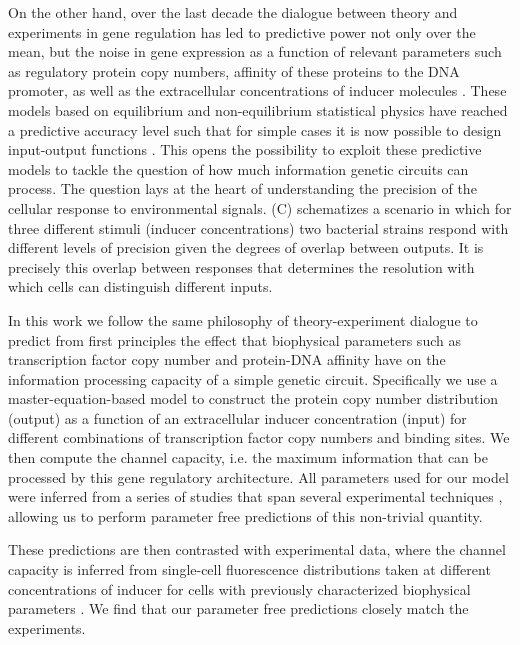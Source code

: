 On the other hand, over the last decade the dialogue between theory and
experiments in gene regulation has led to predictive power not only over the
mean, but the noise in gene expression as a function of relevant parameters such
as regulatory protein copy numbers, affinity of these proteins to the DNA
promoter, as well as the extracellular concentrations of inducer
molecules \cite{Garcia2011c, Jones2014a, Brewster2014, Razo-Mejia2018} . These models based on equilibrium and
non-equilibrium statistical physics have reached a predictive accuracy level
such that for simple cases it is now possible to design input-output functions
\cite{Brewster2012, Barnes2018}. This opens the possibility to exploit these
predictive models to tackle the question of how much information genetic
circuits can process. The question lays at the heart of understanding the
precision of the cellular response to environmental signals.
(C) schematizes a scenario in which for three different
stimuli (inducer concentrations) two bacterial strains respond with different
levels of precision given the degrees of overlap between outputs. It is
precisely this overlap between responses that determines the resolution with
which cells can distinguish different inputs.

In this work we follow the same philosophy of theory-experiment dialogue to
predict from first principles the effect that biophysical parameters such as
transcription factor copy number and protein-DNA affinity have on the
information processing capacity of a simple genetic circuit. Specifically we use
a master-equation-based model to construct the protein copy number distribution
(output) as a function of an extracellular inducer concentration (input) for
different combinations of transcription factor copy numbers and binding sites.
We then compute the channel capacity, i.e. the maximum information that can be
processed by this gene regulatory architecture. All parameters used for our
model were inferred from a series of studies that span several experimental
techniques \cite{Garcia2011c, Brewster2012, Jones2014a, Brewster2014,
Razo-Mejia2018}, allowing us to perform parameter free predictions of this
non-trivial quantity. 

These predictions are then contrasted with experimental data, where the channel
capacity is inferred from single-cell fluorescence distributions taken at
different concentrations of inducer for cells with previously characterized
biophysical parameters \cite{Garcia2011c, Razo-Mejia2018}. We find that our
parameter free predictions closely match the experiments. 

